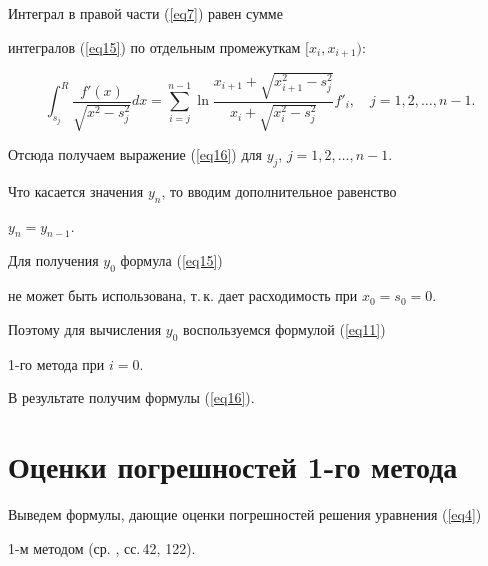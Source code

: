\begin{pf}


Интеграл в правой части (\ref{eq7}) равен сумме


интегралов (\ref{eq15}) по отдельным промежуткам $[x_i,x_{i+1})$:


$$


\int_{s_j}^{R}\frac{f'(x)}{\sqrt{x^2-s_j^2}}dx=


\sum_{i=j}^{n-1}\ln\frac{x_{i+1}+\sqrt{x_{i+1}^2-s_j^2}}


{x_i+\sqrt{x_i^2-s_j^2}}f'_i, \quad j=1,2,\dotsc,n-1.


$$


Отсюда получаем выражение (\ref{eq16}) для $y_j$, $j=1,2,\dotsc,n-1$.


Что касается значения $y_n$, то вводим дополнительное равенство


$y_n=y_{n-1}$.


Для получения $y_0$ формула (\ref{eq15})


не может быть использована, т.\,к. дает расходимость при $x_0=s_0=0$.


Поэтому для вычисления $y_0$ воспользуемся формулой (\ref{eq11})


1-го метода при $i=0$.


В результате получим формулы (\ref{eq16}).


\end{pf}








\section{Оценки погрешностей 1-го метода}





Выведем формулы, дающие оценки погрешностей решения уравнения (\ref{eq4})


1-м методом (ср. \cite{vs}, сс.\,42, 122). 





